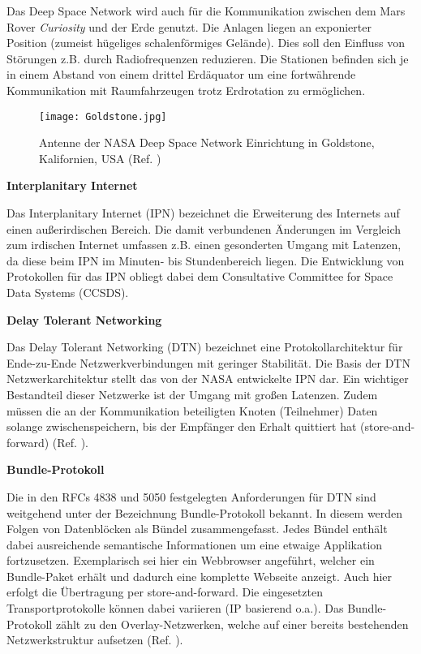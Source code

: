 Das Deep Space Network wird auch f{\"u}r die Kommunikation zwischen dem Mars
Rover \textit{Curiosity} und der Erde genutzt. Die Anlagen liegen an exponierter Position
(zumeist h{\"u}geliges schalenf{\"o}rmiges Gel{\"a}nde). Dies soll den
Einfluss von St{\"o}rungen z.B. durch Radiofrequenzen reduzieren. Die Stationen
befinden sich je in einem Abstand von einem drittel Erd{\"a}quator um eine
fortw{\"a}hrende Kommunikation mit Raumfahrzeugen trotz Erdrotation zu
erm{\"o}glichen.

\begin{figure}[H]
\centering
\texttt{[image: Goldstone.jpg]}
\caption{Antenne der NASA Deep Space Network Einrichtung in Goldstone,
Kalifornien, USA (Ref. \cite{imgGoldstone})}
\label{fig:Goldstone}
\end{figure}

\textbf{Interplanitary Internet}

Das Interplanitary Internet (IPN) bezeichnet die Erweiterung des Internets auf
einen au{\ss}erirdischen Bereich. Die damit verbundenen {\"A}nderungen im
Vergleich zum irdischen Internet umfassen z.B. einen gesonderten Umgang mit
Latenzen, da diese beim IPN im Minuten- bis Stundenbereich liegen. Die
Entwicklung von Protokollen f{\"u}r das IPN obliegt dabei dem Consultative
Committee for Space Data Systems (CCSDS).

\textbf{Delay Tolerant Networking}

Das Delay Tolerant Networking (DTN) bezeichnet eine Protokollarchitektur f{\"u}r
Ende-zu-Ende Netzwerkverbindungen mit geringer Stabilit{\"a}t. Die Basis der
DTN Netzwerkarchitektur stellt das von der NASA entwickelte IPN dar. Ein wichtiger
Bestandteil dieser Netzwerke ist der Umgang mit gro{\ss}en Latenzen. Zudem
m{\"u}ssen die an der Kommunikation beteiligten Knoten (Teilnehmer)
Daten solange zwischenspeichern, bis der Empf{\"a}nger den Erhalt quittiert hat
(store-and-forward) (Ref. \cite{web3}).

\textbf{Bundle-Protokoll}

Die in den RFCs 4838 und 5050 festgelegten Anforderungen f{\"u}r DTN sind
weitgehend unter der Bezeichnung Bundle-Protokoll bekannt. In diesem werden
Folgen von Datenbl{\"o}cken als B{\"u}ndel zusammengefasst. Jedes B{\"u}ndel enth{\"a}lt
dabei ausreichende semantische Informationen um eine etwaige Applikation
fortzusetzen. Exemplarisch sei hier ein Webbrowser angef{\"u}hrt, welcher ein
Bundle-Paket erh{\"a}lt und dadurch eine komplette Webseite anzeigt. Auch hier
erfolgt die {\"U}bertragung per store-and-forward. Die eingesetzten
Transportprotokolle k{\"o}nnen dabei variieren (IP basierend o.a.). Das
Bundle-Protokoll z{\"a}hlt zu den Overlay-Netzwerken, welche auf einer bereits
bestehenden Netzwerkstruktur aufsetzen (Ref. \cite{web1}).

